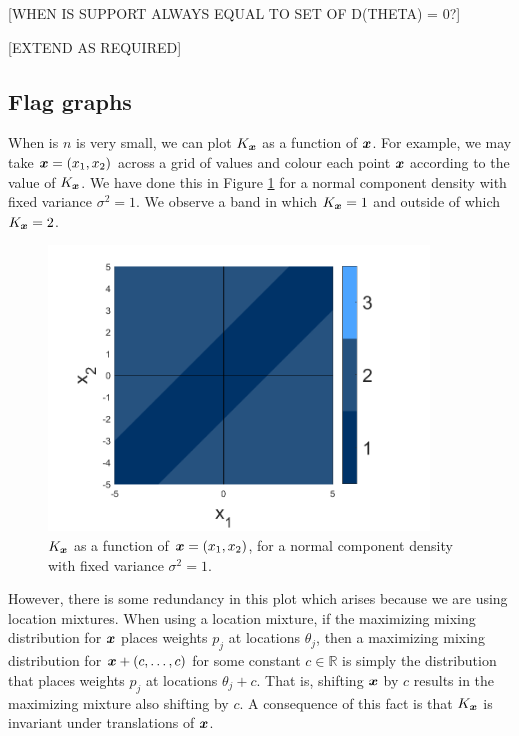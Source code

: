 	[WHEN IS SUPPORT ALWAYS EQUAL TO SET OF D(THETA) = 0?]

	[EXTEND AS REQUIRED]

	\subsection{Flag graphs}
	When is $n$ is very small, we can plot $K_{\bm{{x}}}$ as a function of ${\bm{{x}}}$. For example, we may take ${\bm{{x}}} = (x_1, x_2)$ across a grid of values and colour each point ${\bm{{x}}}$ according to the value of $K_{\bm{{x}}}$. We have done this in Figure \ref{fig:normal_flag_graph_n2} for a normal component density with fixed variance $\sigma^2 = 1$. We observe a band in which $K_{\bm{{x}}} = 1$ and outside of which $K_{\bm{{x}}} = 2$.

	\begin{figure}
		\centering
		\includegraphics[width = 0.9\textwidth]{Figures/Mixtures/normal_flag_graph_n2.png}
		\caption{$K_{\bm{{x}}}$ as a function of ${\bm{{x}}} = (x_1, x_2)$, for a normal component density with fixed variance $\sigma^2 = 1$.}
		\label{fig:normal_flag_graph_n2}
	\end{figure}

	However, there is some redundancy in this plot which arises because we are using location mixtures. When using a location mixture, if the maximizing mixing distribution for ${\bm{{x}}}$ places weights $p_j$ at locations $\theta_j$, then a maximizing mixing distribution for ${\bm{{x}}} + (c, \dots, c)$ for some constant $c \in \mathbb{R}$ is simply the distribution that places weights $p_j$ at locations $\theta_j + c$. That is, shifting ${\bm{{x}}}$ by $c$ results in the maximizing mixture also shifting by $c$. A consequence of this fact is that $K_{\bm{{x}}}$ is invariant under translations of ${\bm{{x}}}$.

